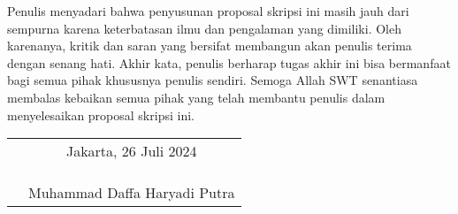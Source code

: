 Penulis menyadari bahwa penyusunan proposal skripsi ini masih jauh dari sempurna
karena keterbatasan ilmu dan pengalaman yang dimiliki. Oleh karenanya, kritik
dan saran yang bersifat membangun akan penulis terima dengan senang hati. Akhir
kata, penulis berharap tugas akhir ini bisa bermanfaat bagi semua pihak
khususnya penulis sendiri. Semoga Allah SWT senantiasa membalas kebaikan semua
pihak yang telah membantu penulis dalam menyelesaikan proposal skripsi ini.

\vspace{4cm}

\begin{tabular}{p{7.5cm}c}
	&Jakarta, 26 Juli 2024\\
	&\\
	&\\
	&\\
	&Muhammad Daffa Haryadi Putra
\end{tabular}
